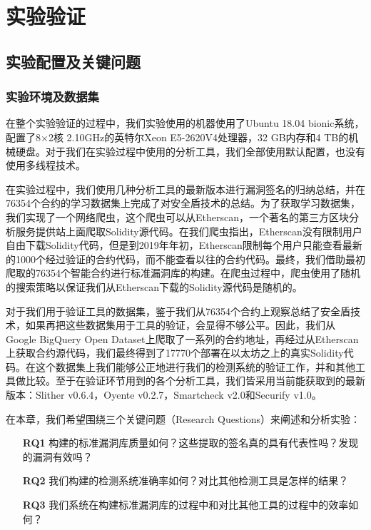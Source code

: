 \chapter{实验验证}

\section{实验配置及关键问题}

\subsection{实验环境及数据集}

在整个实验验证的过程中，我们实验使用的机器使用了Ubuntu 18.04 bionic系统，配置了8$\times$2核 2.10GHz的英特尔Xeon E5-2620V4处理器，32 GB内存和4 TB的机械硬盘。对于我们在实验过程中使用的分析工具，我们全部使用默认配置，也没有使用多线程技术。

在实验过程中，我们使用几种分析工具的最新版本进行漏洞签名的归纳总结，并在76354个合约的学习数据集上完成了对安全盾技术的总结。为了获取学习数据集，我们实现了一个网络爬虫，这个爬虫可以从Etherscan，一个著名的第三方区块分析服务提供站上面爬取Solidity源代码。在我们爬虫指出，Etherscan没有限制用户自由下载Solidity代码，但是到2019年年初，Etherscan限制每个用户只能查看最新的1000个经过验证的合约代码，而不能查看以往的合约代码。最终，我们借助最初爬取的76354个智能合约进行标准漏洞库的构建。在爬虫过程中，爬虫使用了随机的搜索策略以保证我们从Etherscan下载的Solidity源代码是随机的。

对于我们用于验证工具的数据集，鉴于我们从76354个合约上观察总结了安全盾技术，如果再把这些数据集用于工具的验证，会显得不够公平。因此，我们从Google BigQuery Open Dataset上爬取了一系列的合约地址，再经过从Etherscan上获取合约源代码，我们最终得到了17770个部署在以太坊之上的真实Solidity代码。在这个数据集上我们能够公正地进行我们的检测系统的验证工作，并和其他工具做比较。至于在验证环节用到的各个分析工具，我们皆采用当前能获取到的最新版本：Slither v0.6.4，Oyente v0.2.7，Smartcheck v2.0和Securify v1.0。

在本章，我们希望围绕三个关键问题（Research Questions）来阐述和分析实验：
\begin{itemize}
  \item[\textbf{RQ1}] 构建的标准漏洞库质量如何？这些提取的签名真的具有代表性吗？发现的漏洞有效吗？
  \item[\textbf{RQ2}] 我们构建的检测系统准确率如何？对比其他检测工具是怎样的结果？
  \item[\textbf{RQ3}] 我们系统在构建标准漏洞库的过程中和对比其他工具的过程中的效率如何？
\end{itemize}

